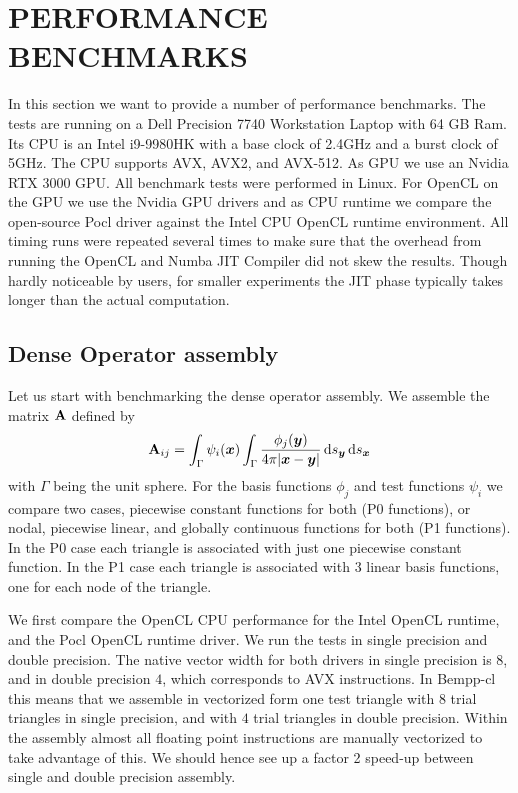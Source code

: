 \section{PERFORMANCE BENCHMARKS}

In this section we want to provide a number of performance benchmarks. The tests are running on a Dell Precision 7740 Workstation Laptop with 64 GB Ram. Its CPU is an Intel i9-9980HK with a base clock of 2.4GHz and a burst clock of 5GHz. The CPU supports AVX, AVX2, and AVX-512.
As GPU we use an Nvidia RTX 3000 GPU. All benchmark tests were performed in Linux. For OpenCL on the GPU we use the Nvidia GPU drivers and as CPU runtime we compare the open-source Pocl driver against the Intel CPU OpenCL runtime environment. All timing runs were repeated several times to make sure that the overhead from running the OpenCL and Numba JIT Compiler did not skew the results. Though hardly noticeable by users, for smaller experiments the JIT phase typically takes longer than the actual computation.

\subsection{Dense Operator assembly}

Let us start with benchmarking the dense operator assembly. We assemble the matrix $\mathbf{A}$ defined by
$$
\dmat{A}_{ij} = \int_{\Gamma}\psi_i(\bx)\int_{\Gamma}\frac{\phi_j(\by)}{4\pi |\bx -\by|}\ds[\by]\ds[\bx]\\
$$
with $\Gamma$ being the unit sphere. For the basis functions $\phi_j$ and test functions $\psi_i$ we compare two cases, piecewise constant functions for both (P0 functions), or nodal, piecewise linear, and globally continuous functions for both (P1 functions). In the P0 case each triangle is associated with just one piecewise constant function. In the P1 case each triangle is associated with $3$ linear basis functions, one for each node of the triangle.

We first compare the OpenCL CPU performance for the Intel OpenCL runtime, and the Pocl OpenCL runtime driver. We run the tests in single precision and double precision. The native vector width for both drivers in single precision is $8$, and in double precision $4$, which corresponds to AVX instructions. In Bempp-cl this means that we assemble in vectorized form one test triangle with $8$ trial triangles in single precision, and with $4$ trial triangles in double precision. Within the assembly almost all floating point instructions are manually vectorized to take advantage of this. We should hence see up a factor 2 speed-up between single and double precision assembly.




